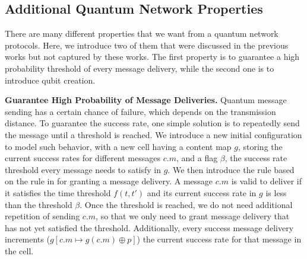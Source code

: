 \subsection{Additional Quantum Network Properties}
\label{sec:add-prop}

There are many different properties that we want from a quantum network protocols.
Here, we introduce two of them that were discussed in the previous works but not captured by these works. 
The first property is to guarantee a high probability threshold of every message delivery,
while the second one is to introduce qubit creation. 

\noindent\textbf{Guarantee High Probability of Message Deliveries.}
Quantum message sending has a certain chance of failure, which depends on the transmission distance.
To guarantee the success rate, one simple solution is to repeatedly send the message until a threshold is reached.
We introduce a new initial configuration  to model such behavior,
with a new cell  having a content map $g$, storing the current success rates for different messages $c.m$, and a flag $\beta$, the success rate threshold every message needs to satisfy in $g$.
We then introduce the  rule based on the  rule in 
for granting a message delivery.
A message $c.m$ is valid to deliver if it satisfies the time threshold $f(t,t')$
and its current success rate in $g$ is less than the threshold $\beta$.
Once the threshold is reached, we do not need additional repetition of sending $c.m$, so that we only need to grant message delivery that has not yet satisfied the threshold.
Additionally, every success message delivery increments ($g[c.m\mapsto g(c.m)\oplus p]$) the current success rate for that message in the  cell.

